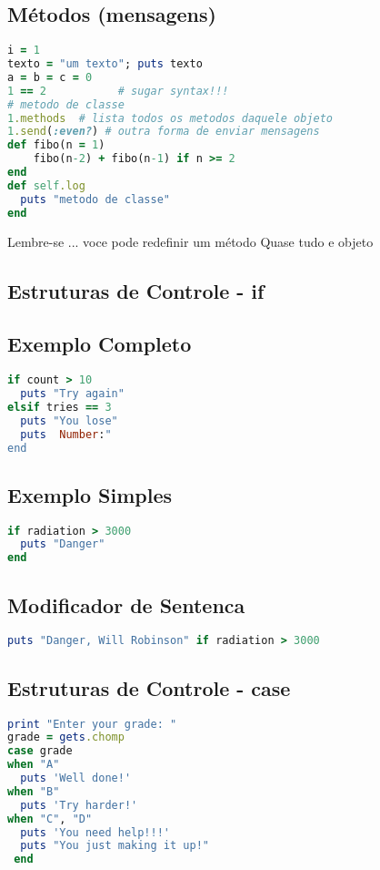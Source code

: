 \documentclass[serif,mathserif]{article}
\begin{document}
\subsection{Métodos (mensagens)}
\begin{lstlisting}[language=ruby]
i = 1        
texto = "um texto"; puts texto
a = b = c = 0
1 == 2           # sugar syntax!!!
# metodo de classe
1.methods  # lista todos os metodos daquele objeto
1.send(:even?) # outra forma de enviar mensagens
def fibo(n = 1)
    fibo(n-2) + fibo(n-1) if n >= 2
end
def self.log
  puts "metodo de classe"
end
\end{lstlisting}

Lembre-se ... voce pode redefinir um método
Quase tudo e objeto

\subsection{Estruturas de Controle - if}
 
       
\subsection {Exemplo Completo}
\begin{lstlisting}[language=ruby]
if count > 10
  puts "Try again"
elsif tries == 3
  puts "You lose"
  puts  Number:"
end
\end{lstlisting}

\subsection {Exemplo Simples}
\begin{lstlisting}[language=ruby]
if radiation > 3000
  puts "Danger"
end
\end{lstlisting}

\subsection {Modificador de Sentenca}
\begin{lstlisting}[language=ruby]
puts "Danger, Will Robinson" if radiation > 3000
\end{lstlisting}

\subsection{Estruturas de Controle - case} 
\begin{lstlisting}[language=ruby]
print "Enter your grade: "
grade = gets.chomp
case grade
when "A"
  puts 'Well done!'
when "B"
  puts 'Try harder!'
when "C", "D"
  puts 'You need help!!!'
  puts "You just making it up!"
 end
\end{lstlisting}
\end{document}
